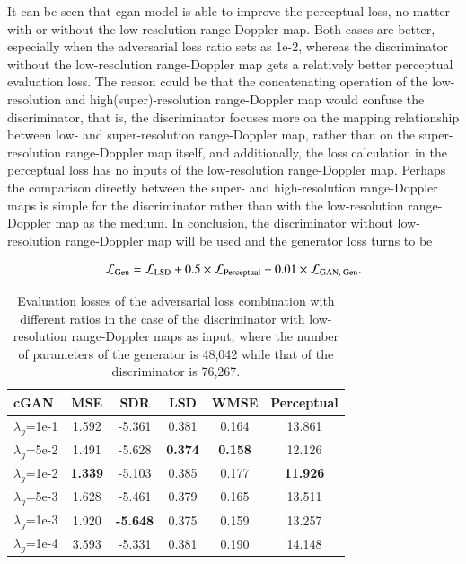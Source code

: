It can be seen that \gls{cgan} model is able to improve the perceptual loss, no matter with or without the low-resolution range-Doppler map. Both cases are better, especially when the adversarial loss ratio sets as 1e-2, whereas the discriminator without the low-resolution range-Doppler map gets a relatively better perceptual evaluation loss. The reason could be that the concatenating operation of the low-resolution and high(super)-resolution range-Doppler map would confuse the discriminator, that is, the discriminator focuses more on the mapping relationship between low- and super-resolution range-Doppler map, rather than on the super-resolution range-Doppler map itself, and additionally, the loss calculation in the perceptual loss has no inputs of the low-resolution range-Doppler map. Perhaps the comparison directly between the super- and high-resolution range-Doppler maps is simple for the discriminator rather than with the low-resolution range-Doppler map as the medium. In conclusion, the discriminator without low-resolution range-Doppler map will be used and the generator loss turns to be

\begin{equation}
    \centering
    \mathcal{L}_{\text{Gen}} = \mathcal{L}_{\text{LSD}} + 0.5 \times \mathcal{L}_{\text{Perceptual}} + 0.01 \times \mathcal{L}_{\text{GAN, Gen}}.
    \label{loss combination}
\end{equation}


\begin{table}[!htp]
    \centering
    \caption{Evaluation losses of the adversarial loss combination with different ratios in the case of the discriminator with low-resolution range-Doppler maps as input, where the number of parameters of the generator is 48,042 while that of the discriminator is 76,267.}
    \label{Evaluation losses of the cGAN model comparison in the case of discriminator with low-resolution image as input}
    \begin{tabular}{l|c|c|c|c|c}
        \hline
        cGAN & MSE & SDR & LSD & WMSE & Perceptual \\
        \hline
        $\lambda_g$=1e-1 & 1.592 & -5.361 & 0.381 & 0.164 & 13.861 \\
        \hline
        $\lambda_g$=5e-2 & 1.491 & -5.628 & \textbf{0.374} & \textbf{0.158} & 12.126 \\
        \hline
        $\lambda_g$=1e-2 & \textbf{1.339} & -5.103 & 0.385 & 0.177 & \textbf{11.926} \\
        \hline
        $\lambda_g$=5e-3 & 1.628 & -5.461 & 0.379 & 0.165 & 13.511 \\
        \hline
        $\lambda_g$=1e-3 & 1.920 & \textbf{-5.648} & 0.375 & 0.159 & 13.257 \\
        \hline
        $\lambda_g$=1e-4 & 3.593 & -5.331 & 0.381 & 0.190 & 14.148 \\
        \hline
    \end{tabular}
\end{table}

